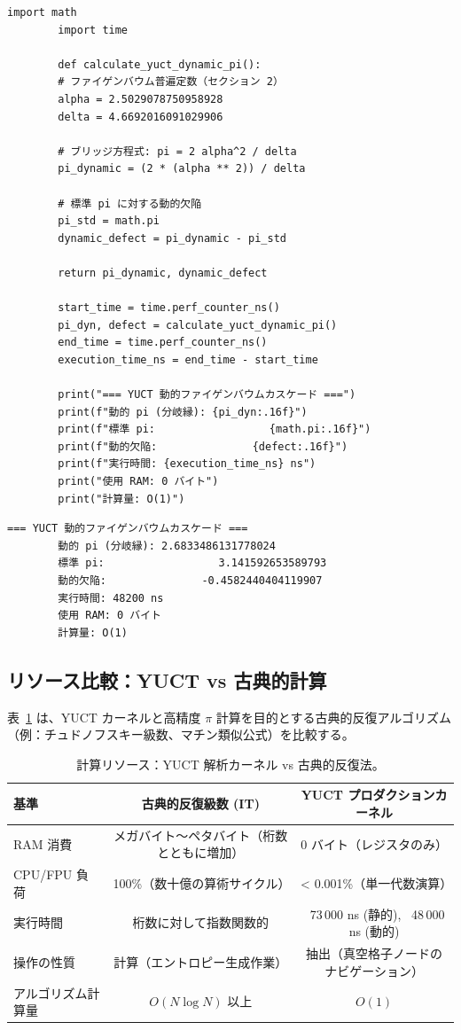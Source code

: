 \documentclass[12pt,a4paper]{article}
\begin{document}
	\begin{lstlisting}[caption={動的ファイゲンバウム $\pi$ のための YUCT カーネル}]
		import math
		import time
		
		def calculate_yuct_dynamic_pi():
		# ファイゲンバウム普遍定数（セクション 2）
		alpha = 2.5029078750958928
		delta = 4.6692016091029906
		
		# ブリッジ方程式: pi = 2 alpha^2 / delta
		pi_dynamic = (2 * (alpha ** 2)) / delta
		
		# 標準 pi に対する動的欠陥
		pi_std = math.pi
		dynamic_defect = pi_dynamic - pi_std
		
		return pi_dynamic, dynamic_defect
		
		start_time = time.perf_counter_ns()
		pi_dyn, defect = calculate_yuct_dynamic_pi()
		end_time = time.perf_counter_ns()
		execution_time_ns = end_time - start_time
		
		print("=== YUCT 動的ファイゲンバウムカスケード ===")
		print(f"動的 pi (分岐縁): {pi_dyn:.16f}")
		print(f"標準 pi:                  {math.pi:.16f}")
		print(f"動的欠陥:               {defect:.16f}")
		print(f"実行時間: {execution_time_ns} ns")
		print("使用 RAM: 0 バイト")
		print("計算量: O(1)")
	\end{lstlisting}
	
	\begin{lstlisting}[style=output, caption={動的カーネルの実行出力}]
		=== YUCT 動的ファイゲンバウムカスケード ===
		動的 pi (分岐縁): 2.6833486131778024
		標準 pi:                  3.141592653589793
		動的欠陥:               -0.4582440404119907
		実行時間: 48200 ns
		使用 RAM: 0 バイト
		計算量: O(1)
	\end{lstlisting}
	
	\subsection{リソース比較：YUCT vs 古典的計算}
	表~\ref{tab:resource} は、YUCT カーネルと高精度 $\pi$ 計算を目的とする古典的反復アルゴリズム（例：チュドノフスキー級数、マチン類似公式）を比較する。
	
	\begin{table}[H]
		\centering
		\scriptsize
		\caption{計算リソース：YUCT 解析カーネル vs 古典的反復法。}
		\label{tab:resource}
		\begin{tabular}{@{}lcc@{}}
			\toprule
			\textbf{基準} & \textbf{古典的反復級数 (IT)} & \textbf{YUCT プロダクションカーネル} \\
			\midrule
			RAM 消費 & メガバイト～ペタバイト（桁数とともに増加） & 0 バイト（レジスタのみ） \\
			CPU/FPU 負荷 & 100\%（数十億の算術サイクル） & < 0.001\%（単一代数演算） \\
			実行時間 & 桁数に対して指数関数的 & ~73\,000 ns (静的), ~48\,000 ns (動的) \\
			操作の性質 & 計算（エントロピー生成作業） & 抽出（真空格子ノードのナビゲーション） \\
			アルゴリズム計算量 & $O(N\log N)$ 以上 & $O(1)$ \\
			\bottomrule
		\end{tabular}
	\end{table}
	
\end{document}
